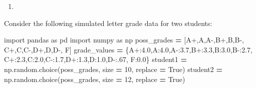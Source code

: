 \documentclass[
  12pt,
  krantz2]{krantz}
\makeatletter
\newenvironment{Shaded}{\begin{snugshade}}{\end{snugshade}}
\newcommand{\DecValTok}[1]{\textcolor[rgb]{0.06,0.06,0.06}{#1}}
\newcommand{\FloatTok}[1]{\textcolor[rgb]{0.06,0.06,0.06}{#1}}
\newcommand{\ImportTok}[1]{#1}
\newcommand{\NormalTok}[1]{#1}
\newcommand{\OperatorTok}[1]{\textcolor[rgb]{0.43,0.43,0.43}{\textbf{#1}}}
\newcommand{\StringTok}[1]{\textcolor[rgb]{0.5,0.5,0.5}{#1}}
\newcommand{\VariableTok}[1]{\textcolor[rgb]{0,0,0}{#1}}
\providecommand{\tightlist}{%
  \setlength{\itemsep}{0pt}\setlength{\parskip}{0pt}}
\newenvironment{kframe}{%
\medskip{}
\setlength{\fboxsep}{.8em}
 \def\at@end@of@kframe{}%
 \ifinner\ifhmode%
  \def\at@end@of@kframe{\end{minipage}}%
  \begin{minipage}{\columnwidth}%
 \fi\fi%
 \def\FrameCommand##1{\hskip\@totalleftmargin \hskip-\fboxsep
 \colorbox{shadecolor}{##1}\hskip-\fboxsep
     \hskip-\linewidth \hskip-\@totalleftmargin \hskip\columnwidth}%
 \MakeFramed {\advance\hsize-\width
   \@totalleftmargin\z@ \linewidth\hsize
   \@setminipage}}%
 {\par\unskip\endMakeFramed%
 \at@end@of@kframe}
\renewenvironment{Shaded}{\begin{kframe}}{\end{kframe}}
\makeatother
\begin{document}
\begin{enumerate}
\def\labelenumi{\arabic{enumi}.}
\tightlist
\item
\end{enumerate}

Consider the following simulated letter grade data for two students:

\begin{Shaded}
\begin{Highlighting}[]
\ImportTok{import}\NormalTok{ pandas }\ImportTok{as}\NormalTok{ pd}
\ImportTok{import}\NormalTok{ numpy }\ImportTok{as}\NormalTok{ np}
\NormalTok{poss\_grades }\OperatorTok{=}\NormalTok{ [}\StringTok{\textquotesingle{}A+\textquotesingle{}}\NormalTok{,}\StringTok{\textquotesingle{}A\textquotesingle{}}\NormalTok{,}\StringTok{\textquotesingle{}A{-}\textquotesingle{}}\NormalTok{,}\StringTok{\textquotesingle{}B+\textquotesingle{}}\NormalTok{,}\StringTok{\textquotesingle{}B\textquotesingle{}}\NormalTok{,}\StringTok{\textquotesingle{}B{-}\textquotesingle{}}\NormalTok{,}
               \StringTok{\textquotesingle{}C+\textquotesingle{}}\NormalTok{,}\StringTok{\textquotesingle{}C\textquotesingle{}}\NormalTok{,}\StringTok{\textquotesingle{}C{-}\textquotesingle{}}\NormalTok{,}\StringTok{\textquotesingle{}D+\textquotesingle{}}\NormalTok{,}\StringTok{\textquotesingle{}D\textquotesingle{}}\NormalTok{,}\StringTok{\textquotesingle{}D{-}\textquotesingle{}}\NormalTok{,}
               \StringTok{\textquotesingle{}F\textquotesingle{}}\NormalTok{]}
\NormalTok{grade\_values }\OperatorTok{=}\NormalTok{ \{}\StringTok{\textquotesingle{}A+\textquotesingle{}}\NormalTok{:}\FloatTok{4.0}\NormalTok{,}\StringTok{\textquotesingle{}A\textquotesingle{}}\NormalTok{:}\FloatTok{4.0}\NormalTok{,}\StringTok{\textquotesingle{}A{-}\textquotesingle{}}\NormalTok{:}\FloatTok{3.7}\NormalTok{,}\StringTok{\textquotesingle{}B+\textquotesingle{}}\NormalTok{:}\FloatTok{3.3}\NormalTok{,}\StringTok{\textquotesingle{}B\textquotesingle{}}\NormalTok{:}\FloatTok{3.0}\NormalTok{,}\StringTok{\textquotesingle{}B{-}\textquotesingle{}}\NormalTok{:}\FloatTok{2.7}\NormalTok{,}
                \StringTok{\textquotesingle{}C+\textquotesingle{}}\NormalTok{:}\FloatTok{2.3}\NormalTok{,}\StringTok{\textquotesingle{}C\textquotesingle{}}\NormalTok{:}\FloatTok{2.0}\NormalTok{,}\StringTok{\textquotesingle{}C{-}\textquotesingle{}}\NormalTok{:}\FloatTok{1.7}\NormalTok{,}\StringTok{\textquotesingle{}D+\textquotesingle{}}\NormalTok{:}\FloatTok{1.3}\NormalTok{,}\StringTok{\textquotesingle{}D\textquotesingle{}}\NormalTok{:}\FloatTok{1.0}\NormalTok{,}\StringTok{\textquotesingle{}D{-}\textquotesingle{}}\NormalTok{:}\FloatTok{.67}\NormalTok{,}
                \StringTok{\textquotesingle{}F\textquotesingle{}}\NormalTok{:}\FloatTok{0.0}\NormalTok{\}}
\NormalTok{student1 }\OperatorTok{=}\NormalTok{ np.random.choice(poss\_grades, size }\OperatorTok{=} \DecValTok{10}\NormalTok{, replace }\OperatorTok{=} \VariableTok{True}\NormalTok{)}
\NormalTok{student2 }\OperatorTok{=}\NormalTok{ np.random.choice(poss\_grades, size }\OperatorTok{=} \DecValTok{12}\NormalTok{, replace }\OperatorTok{=} \VariableTok{True}\NormalTok{)}
\end{Highlighting}
\end{Shaded}
\end{document}
